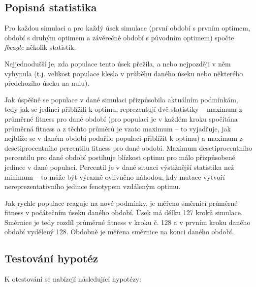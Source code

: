 \subsection{Popisná statistika}

Pro každou simulaci a pro každý úsek simulace (první období s prvním optimem,
období s druhým optimem a závěrečné období s původním optimem) spočte \textit{fbeagle} několik statistik.

Nejjednodušší je, zda populace tento úsek přežila, a nebo nejpozději v něm vyhynula
(t.j. velikost populace klesla v průběhu daného úseku nebo některého předchozího úseku na nulu).

Jak úspěšně se populace v dané simulaci přizpůsobila aktuálním podmínkám, tedy jak se jedinci přiblížili k optimu,
reprezentují dvě statistiky -- maximum z průměrné fitness pro dané období (pro populaci je v každém kroku
spočítána průměrná fitness a z těchto průměrů je vzato maximum -- to vyjadřuje, jak nejblíže se v daném období podařilo
populaci přiblížit k optimu) a maximum z desetiprocentního percentilu fitness pro dané období.
Maximum desetiprocentního percentilu pro dané období postihuje blízkost optimu pro
málo přizpůsobené jedince v dané populaci. Percentil je v dané situaci výstižnější statistika než minimum -- to může
být výrazně ovlivněno náhodou, kdy mutace vytvoří nereprezentativního jedince fenotypem vzdáleným optimu.

Jak rychle populace reaguje na nové podmínky, je měřeno směrnicí průměrné fitness v počátečním úseku daného období.
Úsek má délku 127 kroků simulace. Směrnice je tedy rozdíl průměrné fitness v kroku č. 128 a v prvním kroku daného
období vydělený 128. Obdobně je měřena směrnice na konci daného období.

\subsection{Testování hypotéz}

K otestování se nabízejí následující hypotézy:

